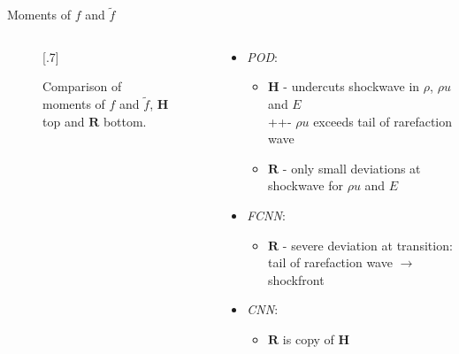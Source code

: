 \documentclass[usenames,dvipsnames,Nike,mathserif]{tuberlinbeamer}
\begin{document}
\begin{frame}[fragile]{Moments of $f$ and $\tilde{f}$}
	\begin{columns}
		\begin{column}{.61\textwidth}
			\begin{figure}
				\scalebox{.7}[.7]{}
				\caption{
					Comparison of moments of $f$ and $\tilde{f}$, $\mathbf{H}$ top and $\mathbf{R}$ bottom.}
			\end{figure}
		\end{column}
		\begin{column}{.39\textwidth}
			\begin{itemize}
				\item\emph{POD}:
				\begin{itemize}
					\item $\mathbf{H}$ - undercuts shockwave in $\rho$, $\rho u$ and $E$\\
									   ++\quad - $\rho u$ exceeds tail of rarefaction wave
					
					\item $\mathbf{R}$ - only small deviations at shockwave for $\rho u$ and $E$
				\end{itemize}
				\item\emph{FCNN}:
				\begin{itemize}
					\item $\mathbf{R}$ - severe deviation at transition: tail of rarefaction wave $\rightarrow$ shockfront 
				\end{itemize}
				\item\emph{CNN}:
				\begin{itemize}
					\item $\mathbf{R}$ is copy of $\mathbf{H}$ 
				\end{itemize}
			\end{itemize}
		\end{column}
	\end{columns}
\end{frame}
\end{document}
